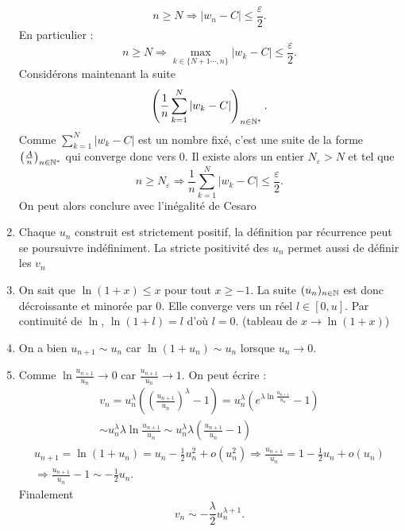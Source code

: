 \begin{enumerate}
\begin{displaymath}
 n\geq N \Rightarrow \vert w_n-C \vert \leq \dfrac{\varepsilon}{2} .
\end{displaymath}
En particulier :
\begin{displaymath}
 n\geq N \Rightarrow \max_{k\in \{N+1\cdots,n\}}\vert w_k-C \vert \leq \dfrac{\varepsilon}{2} .
\end{displaymath}
Considérons maintenant la suite
\begin{displaymath}
 \left( \dfrac{1}{n}\sum_{k=1}^{N} \vert w_k-C \vert\right)_{n\in \mathbb{N}^*} .
\end{displaymath}
Comme $\sum_{k=1}^{N} \vert w_k-C \vert$ est un nombre fixé, c'est une suite de la forme $\left(\frac{A}{n} \right)_{n\in\mathbb{N}^*}$ qui converge donc vers $0$. Il existe alors un entier $N_\varepsilon >N$ et tel que
\begin{displaymath}
 n\geq N_\varepsilon \Rightarrow \dfrac{1}{n}\sum_{k=1}^{N} \vert w_k-C \vert \leq \dfrac{\varepsilon}{2}.
\end{displaymath}
On peut alors conclure avec l'inégalité de Cesaro

\item  Chaque $u_{n}$ construit est strictement positif, la d{\'e}finition
par r{\'e}currence peut se poursuivre ind{\'e}finiment. La stricte positivité des
$u_{n} $ permet aussi de d{\'e}finir les $v_{n}$

\item  On sait que $\ln (1+x)\leq x$ pour tout $x\geq -1$. La suite $(u_{n})_{n\in \mathbb{N}}$ est donc d{\'e}croissante et minor{\'e}e par $0$. Elle converge vers un r{\'e}el $l\in \left[ 0,u\right]$.\newline
Par continuit{\'e} de $\ln $, $\ln (1+l)=l$ d'o{\`u} $l=0$. (tableau de $x\rightarrow \ln (1+x)$)

\item  On a bien $u_{n+1}\sim u_{n}$ car $\ln (1+u_{n})\sim u_{n}$ lorsque $u_{n}\rightarrow 0$.

\item  Comme $\ln \frac{u_{n+1}}{u_{n}}\rightarrow 0$ car $\frac{u_{n+1}}{u_{n}}\rightarrow 1$. On peut {\'e}crire :
\begin{multline*}
v_{n} = u_{n}^{\lambda }\left( \left( \frac{u_{n+1}}{u_{n}}\right) ^{\lambda }-1\right)
 = u_{n}^{\lambda }\left( e^{\lambda \ln \frac{u_{n+1}}{u_{n}}}-1\right) \\
 \sim  u_{n}^{\lambda }\lambda \ln \frac{u_{n+1}}{u_{n}} 
\sim  u_{n}^{\lambda }\lambda \left( \frac{u_{n+1}}{u_{n}}-1\right) 
\end{multline*}
\begin{multline*}
u_{n+1} = \ln (1+u_{n}) = u_{n}-\frac{1}{2}u_{n}^{2}+o(u_{n}^{2}) \Rightarrow
\frac{u_{n+1}}{u_{n}} = 1-\frac{1}{2}u_{n}+o(u_{n})\\
\Rightarrow \frac{u_{n+1}}{u_{n}} -1  \sim  -\frac{1}{2}u_{n}.
\end{multline*}
Finalement 
\begin{displaymath}
 v_{n}\sim -\frac{\lambda }{2}u_{n}^{\lambda +1}.
\end{displaymath}


\end{enumerate}
